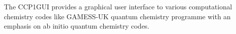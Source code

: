 The CCP1GUI provides a graphical user interface to various computational chemistry codes like GAMESS-UK quantum chemistry programme with an emphasis on ab initio quantum chemistry codes.